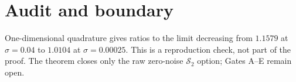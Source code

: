 \documentclass[11pt]{article}
\begin{document}
\section{Audit and boundary}
One-dimensional quadrature gives ratios to the limit decreasing from
$1.1579$ at $\sigma=0.04$ to $1.0104$ at $\sigma=0.00025$.
This is a reproduction check, not part of the proof.  The theorem closes only
the raw zero-noise $\mathcal S_2$ option; Gates A--E remain open.
\end{document}
